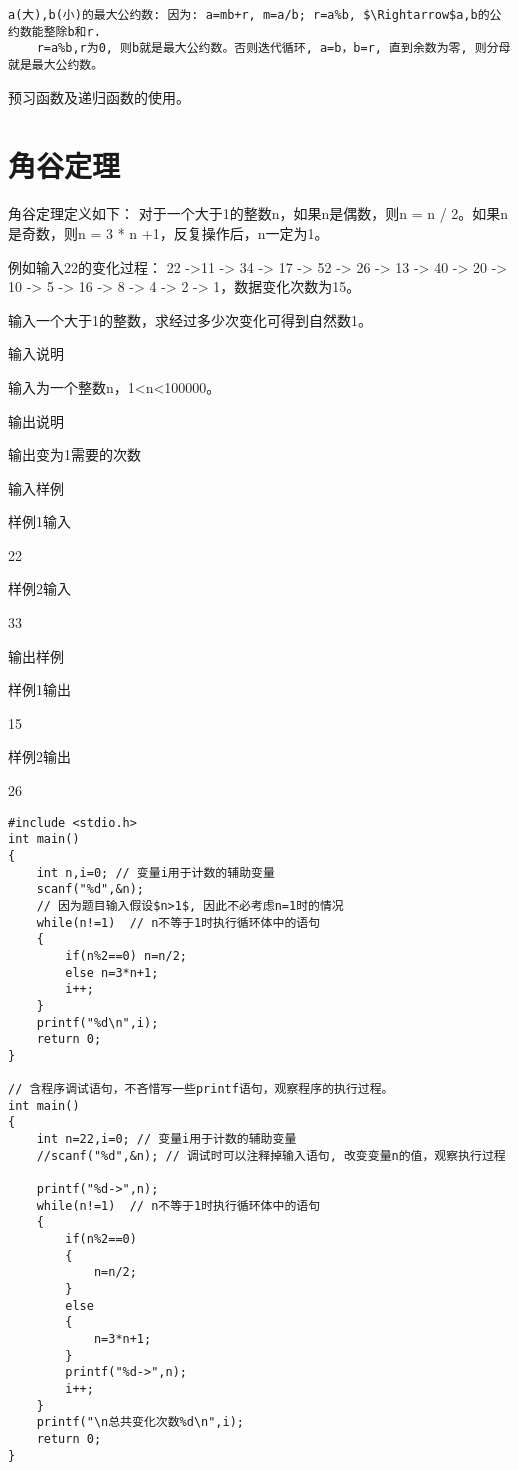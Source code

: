 \begin{note}[欧几里得定理]
	\begin{lstlisting}[frame=none]
	a(大),b(小)的最大公约数: 因为: a=mb+r, m=a/b; r=a%b, $\Rightarrow$a,b的公约数能整除b和r.
	r=a%b,r为0, 则b就是最大公约数。否则迭代循环, a=b，b=r, 直到余数为零, 则分母就是最大公约数。
	\end{lstlisting}
\end{note}

\begin{note}
	预习函数及递归函数的使用。
\end{note}

\section{角谷定理}\label{Valley Angle theorem}
角谷定理定义如下：
对于一个大于1的整数n，如果n是偶数，则n = n / 2。如果n是奇数，则n = 3 * n +1，反复操作后，n一定为1。

例如输入22的变化过程： 22 ->11 -> 34 -> 17 -> 52 -> 26 -> 13 -> 40 -> 20 -> 10 -> 5 -> 16 -> 8 -> 4 -> 2 -> 1，数据变化次数为15。

输入一个大于1的整数，求经过多少次变化可得到自然数1。

输入说明	

输入为一个整数n，1<n<100000。

输出说明	

输出变为1需要的次数

输入样例

样例1输入

22

样例2输入

33

输出样例

样例1输出

15

样例2输出

26

\begin{lstlisting}
#include <stdio.h>
int main()
{
	int n,i=0; // 变量i用于计数的辅助变量
	scanf("%d",&n);
	// 因为题目输入假设$n>1$, 因此不必考虑n=1时的情况
	while(n!=1)  // n不等于1时执行循环体中的语句
	{
		if(n%2==0) n=n/2;
		else n=3*n+1;
		i++;
	} 
	printf("%d\n",i);
	return 0;	
}

// 含程序调试语句，不吝惜写一些printf语句，观察程序的执行过程。 
int main()
{
	int n=22,i=0; // 变量i用于计数的辅助变量
	//scanf("%d",&n); // 调试时可以注释掉输入语句, 改变变量n的值，观察执行过程 
	
	printf("%d->",n);
	while(n!=1)  // n不等于1时执行循环体中的语句
	{
		if(n%2==0) 
		{ 
			n=n/2;
		} 
		else 
		{
			n=3*n+1;
		}
		printf("%d->",n);
		i++;
	} 
	printf("\n总共变化次数%d\n",i);
	return 0;	
}
\end{lstlisting}

